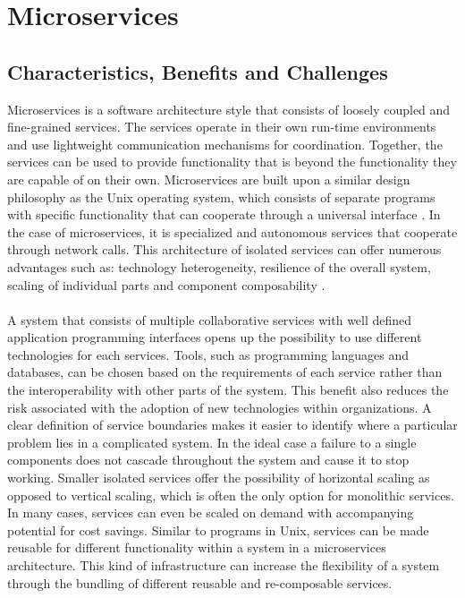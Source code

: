 \chapter{Microservices}
\label{chapter:microservices}

\section{Characteristics, Benefits and Challenges}

Microservices is a software architecture style that consists of loosely coupled and fine-grained services. The services operate in their own run-time environments and use lightweight communication mechanisms for coordination. Together, the services can be used to provide functionality that is beyond the functionality they are capable of on their own. Microservices are built upon a similar design philosophy as the Unix operating system, which consists of separate programs with specific functionality that can cooperate through a universal interface \cite{raymond2003art}. In the case of microservices, it is specialized and autonomous services that cooperate through network calls. This architecture of isolated services can offer numerous advantages such as: technology heterogeneity, resilience of the overall system, scaling of individual parts and component composability \cite{newman2015building}.
\\ \\
A system that consists of multiple collaborative services with well defined application programming interfaces opens up the possibility to use different technologies for each services. Tools, such as programming languages and databases, can be chosen based on the requirements of each service rather than the interoperability with other parts of the system. This benefit also reduces the risk associated with the adoption of new technologies within organizations. A clear definition of service boundaries makes it easier to identify where a particular problem lies in a complicated system. In the ideal case a failure to a single components does not cascade throughout the system and cause it to stop working. Smaller isolated services offer the possibility of horizontal scaling as opposed to vertical scaling, which is often the only option for monolithic services. In many cases, services can even be scaled on demand with accompanying potential for cost savings. Similar to programs in Unix, services can be made reusable for different functionality within a system in a microservices architecture. This kind of infrastructure can increase the flexibility of a system through the bundling of different reusable and re-composable services.
